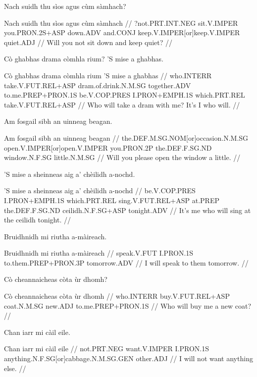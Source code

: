 \documentclass[a4paper,10pt]{article}
\begin{document}
\ex
\begingl
\glpre Nach suidh thu sìos agus cùm sàmhach? 

\vspace{4mm}
\gla Nach suidh thu sìos agus cùm sàmhach  //
\glb ?not.PRT.INT.NEG sit.V.IMPER you.PRON.2S+ASP down.ADV and.CONJ keep.V.IMPER[or]keep.V.IMPER quiet.ADJ  //
\glft Will you not sit down and keep quiet? //
\endgl
\xe

\ex
\begingl
\glpre Cò ghabhas drama còmhla rium? 'S mise a ghabhas. 

\vspace{4mm}
\gla Cò ghabhas drama còmhla rium 'S mise a ghabhas  //
\glb who.INTERR take.V.FUT.REL+ASP dram.of.drink.N.M.SG together.ADV to.me.PREP+PRON.1S be.V.COP.PRES I.PRON+EMPH.1S which.PRT.REL take.V.FUT.REL+ASP  //
\glft Who will take a dram with me? It's I who will. //
\endgl
\xe

\ex
\begingl
\glpre Am fosgail sibh an uinneag beagan. 

\vspace{4mm}
\gla Am fosgail sibh an uinneag beagan  //
\glb the.DEF.M.SG.NOM[or]occasion.N.M.SG open.V.IMPER[or]open.V.IMPER you.PRON.2P the.DEF.F.SG.ND window.N.F.SG little.N.M.SG  //
\glft Will you please open the window a little. //
\endgl
\xe

\ex
\begingl
\glpre 'S mise a sheinneas aig a' chèilidh a-nochd. 

\vspace{4mm}
\gla 'S mise a sheinneas aig a' chèilidh a-nochd  //
\glb be.V.COP.PRES I.PRON+EMPH.1S which.PRT.REL sing.V.FUT.REL+ASP at.PREP the.DEF.F.SG.ND ceilidh.N.F.SG+ASP tonight.ADV  //
\glft It's me who will sing at the ceilidh tonight. //
\endgl
\xe

\ex
\begingl
\glpre Bruidhnidh mi riutha a-màireach. 

\vspace{4mm}
\gla Bruidhnidh mi riutha a-màireach  //
\glb speak.V.FUT I.PRON.1S to.them.PREP+PRON.3P tomorrow.ADV  //
\glft I will speak to them tomorrow. //
\endgl
\xe

\ex
\begingl
\glpre Cò cheannaicheas còta ùr dhomh? 

\vspace{4mm}
\gla Cò cheannaicheas còta ùr dhomh  //
\glb who.INTERR buy.V.FUT.REL+ASP coat.N.M.SG new.ADJ to.me.PREP+PRON.1S  //
\glft Who will buy me a new coat? //
\endgl
\xe

\ex
\begingl
\glpre Chan iarr mi càil eile. 

\vspace{4mm}
\gla Chan iarr mi càil eile  //
\glb not.PRT.NEG want.V.IMPER I.PRON.1S anything.N.F.SG[or]cabbage.N.M.SG.GEN other.ADJ  //
\glft I will not want anything else. //
\endgl
\xe
\end{document}
